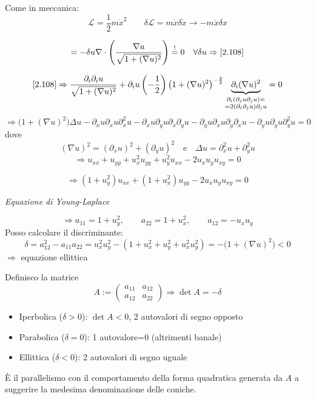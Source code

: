 \documentclass[a4paper,11pt]{report}
\begin{document}
Come in meccanica:
\[
\mathcal{L}=\frac{1}{2} m \dot{x}^2 \qquad \delta \mathcal{L} = m \dot{x} \delta \dot{x} \rightarrow -m \ddot{x} \delta x
\]

\medskip

\[
= -\delta u \nabla \cdot \left(\frac{\nabla u}{\sqrt{1+(\nabla u)^2}}\right)\overset{!}{=}0 \quad \forall \delta u \Rightarrow \eqref{2.108}
\]

\medskip

\[
\eqref{2.108} \Rightarrow \frac{\partial_i \partial_i u}{\sqrt{1+(\nabla u)^2}} + \partial_i u \left(-\frac{1}{2}\right) \big(1+(\nabla u)^2\big)^{-\frac{3}{2}} \underbrace{\partial_i (\nabla u)^2}_{ \substack{\partial_i(\partial_j u \partial_j u)= \\ =2(\partial_i\partial_j u)\partial_j u } } =0
\]
\[
\Rightarrow \big(1+ (\nabla u)^2 \big) \Delta u - \partial_x u \partial_x u \partial_x^2 u - \partial_x u\partial_y u \partial_x\partial_y u - \partial_yu \partial_x u \partial_y \partial_x u - \partial_y u\partial_y u \partial_y^2 u =0
\]
dove
\[
(\nabla u)^2=(\partial_x u)^2 + (\partial_y u)^2 \quad \text{e}\quad \Delta u =\partial_x^2 u + \partial_y^2 u
\]
\[
\Rightarrow u_{xx} + u_{yy} + u_x^2 u_{yy} + u_y^2 u_{xx} - 2u_xu_y u_{xy}=0
\]
\begin{samepage}
\begin{equation}
\Rightarrow (1+u_y^2)u_{xx} + (1+u_x^2) u_{yy} - 2u_x u_y u_{xy}=0 
\tag{$\theequation^\prime$}
\label{2.108'}
\end{equation}
\centerline{\emph{Equazione di Young-Laplace}}
\end{samepage}
\[
\Rightarrow a_{11}=1+u_y^2, \qquad a_{22}=1+u_x^2, \qquad a_{12}=-u_x u_y
\]
Posso calcolare il discriminante:
\[
\delta = a_{12}^2 -a_{11}a_{22} = u_x^2 u_y^2 - (1+u_x^2 + u_y^2 + u_x^2u_y^2)=-\big(1+(\nabla u)^2\big) <0
\]
$\Rightarrow$ equazione ellittica

\medskip

Definisco la matrice 
\[
A:=\left(\begin{matrix}
a_{11} & a_{12}\\
a_{12} & a_{22}
\end{matrix}\right) \Rightarrow \det A=-\delta
\]
\begin{itemize}
\item Iperbolica ($\delta >0$): $\det A<0$, 2 autovalori di segno opposto
\item Parabolica ($\delta =0$): 1 autovalore=0 (altrimenti banale)
\item Ellittica ($\delta <0$): 2 autovalori di segno uguale
\end{itemize}
\`E il parallelismo con il comportamento della forma quadratica generata da $A$ a suggerire la medesima denominazione delle coniche.
\end{document}

